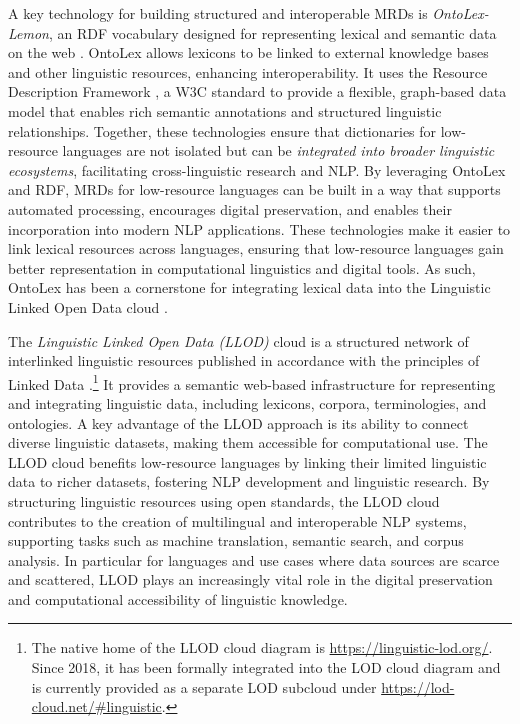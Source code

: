 A key technology for building structured and interoperable MRDs is \emph{OntoLex-Lemon}, an RDF vocabulary  designed for representing lexical and semantic data on the web \cite{mccrae2017ontolex}. OntoLex allows lexicons to be linked to external knowledge bases and other linguistic resources, enhancing interoperability. It uses the Resource Description Framework \cite[RDF]{beckett2014rdf}, a W3C standard to provide a flexible, graph-based data model that enables rich semantic annotations and structured linguistic relationships. Together, these technologies ensure that dictionaries for low-resource languages are not isolated but can be \emph{integrated into broader linguistic ecosystems}, facilitating cross-linguistic research and NLP. By leveraging OntoLex and RDF, MRDs for low-resource languages can be built in a way that supports automated processing, encourages digital preservation, and enables their incorporation into modern NLP applications. 
These technologies make it easier to link lexical resources across languages, ensuring that low-resource languages gain better representation in computational linguistics and digital tools. As such, OntoLex has been a cornerstone for integrating lexical data into the Linguistic Linked Open Data cloud \cite{declerck2018towards}. 

The \emph{Linguistic Linked Open Data (LLOD)} cloud \cite{chiarcos2011towards,pareja2019development,cimiano2020linguistic} is a structured network of interlinked linguistic resources published in accordance with the principles of Linked Data \cite{bizer2009linked}.\footnote{
    The native home of the LLOD cloud diagram is \url{https://linguistic-lod.org/}. Since 2018, it has been formally integrated into the LOD cloud diagram and is currently provided as a separate LOD subcloud under \url{https://lod-cloud.net/\#linguistic}.
} 
It provides a semantic web-based infrastructure for representing and integrating linguistic data, including lexicons, corpora, terminologies, and ontologies.
A key advantage of the LLOD approach is its ability to connect diverse linguistic datasets, making them accessible for computational use. 
The LLOD cloud benefits low-resource languages by linking their limited linguistic data to richer datasets, fostering NLP development and linguistic research. By structuring linguistic resources using open standards, the LLOD cloud contributes to the creation of multilingual and interoperable NLP systems, supporting tasks such as machine translation, semantic search, and corpus analysis. In particular for languages and use cases where data sources are scarce and scattered, LLOD plays an increasingly vital role in the digital preservation and computational accessibility of linguistic knowledge.  


